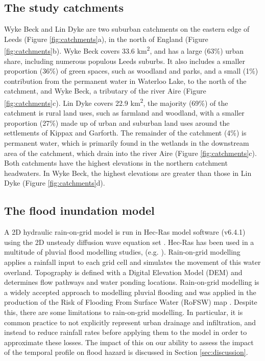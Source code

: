 \documentclass[APA,Times2COL]{WileyNJDv5}
\begin{document}
\subsection{The study catchments}\label{subsec:model:catchments}
Wyke Beck and Lin Dyke are two suburban catchments on the eastern edge of Leeds (Figure \ref{fig:catchments}a), in the north of England (Figure \ref{fig:catchments}b). Wyke Beck covers 33.6 km\textsuperscript{2}, and has a large (63\%) urban share, including numerous populous Leeds suburbs. It also includes a smaller proportion (36\%) of green spaces, such as woodland and parks, and a small (1\%) contribution from the permanent water in Waterloo Lake, to the north of the catchment, and Wyke Beck, a tributary of the river Aire (Figure \ref{fig:catchments}c). Lin Dyke covers 22.9 km\textsuperscript{2}, the majority (69\%) of the catchment is rural land uses, such as farmland and woodland, with a smaller proportion (27\%) made up of urban and suburban land uses around the settlements of Kippax and Garforth. The remainder of the catchment (4\%) is permanent water, which is primarily found in the wetlands in the downstream area of the catchment, which drain into the river Aire (Figure \ref{fig:catchments}c). Both catchments have the highest elevations in the northern catchment headwaters. In Wyke Beck, the highest elevations are greater than those in Lin Dyke (Figure \ref{fig:catchments}d). 

\subsection{The flood inundation model}\label{subsec:model:catchments}

A 2D hydraulic rain-on-grid model is run in Hec-Ras model software (v6.4.1) using the 2D unsteady diffusion wave equation set \citep{brunner2016hec}. Hec-Ras has been used in a multitude of pluvial flood modelling studies, (e.g. \citealt{costabile2021hec, yalcin2020assessing, singh2023drainage, rangari2019assessment}). Rain-on-grid modelling applies a rainfall input to each grid cell and simulates the movement of this water overland. Topography is defined with a Digital Elevation Model (DEM) and determines flow pathways and water ponding locations. Rain-on-grid modelling is a widely accepted approach to modelling pluvial flooding and was applied in the production of the Risk of Flooding From Surface Water (RoFSW) map \citep{envagency2019}. Despite this, there are some limitations to rain-on-grid modelling. In particular, it is common practice to not explicitly represent urban drainage and infiltration, and instead to reduce rainfall rates before applying them to the model in order to approximate these losses. The impact of this on our ability to assess the impact of the temporal profile on flood hazard is discussed in Section \ref{sec:discussion}.
\end{document}
